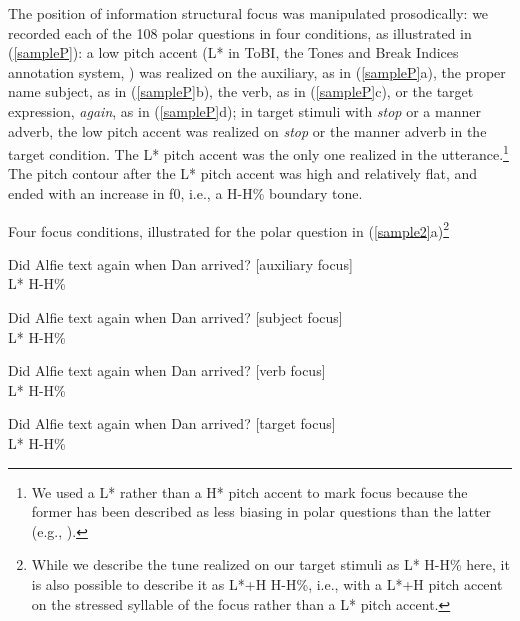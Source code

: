 \documentclass[a4paper,12pt]{article}
\newcommand{\6}{\mbox{$[\hspace*{-.6mm}[$}}
\newcommand{\9}{\mbox{$]\hspace*{-.6mm}]$}}
\begin{document}
The position of information structural focus was manipulated prosodically: we recorded each of the 108 polar questions in four conditions, as illustrated in (\ref{sampleP}): a low pitch accent (L* in ToBI, the Tones and Break Indices annotation system, \citealt{beckman-ayers97}) was realized on the auxiliary, as in (\ref{sampleP}a), the proper name subject, as in (\ref{sampleP}b),  the verb, as in (\ref{sampleP}c), or the target expression, {\em again}, as in (\ref{sampleP}d); in target stimuli with {\em stop} or a manner adverb, the low pitch accent was realized on {\em stop} or the manner adverb in the target condition. The L* pitch accent was the only one realized in the utterance.\footnote{We used a L* rather than a H* pitch accent to mark focus because the former has been described as less biasing in polar questions than the latter (e.g., \citealt[290ff.]{pierrehumbert-hirschberg1990}).} The pitch contour after the L* pitch accent was high and relatively flat, and ended with an increase in f0, i.e., a H-H\% boundary tone.
 
\begin{exe}
\ex\label{sampleP} Four focus conditions, illustrated for the polar question in (\ref{sample2}a)\footnote{While we describe the tune realized on our target stimuli as L* H-H\% here, it is also possible to describe it as L*+H H-H\%, i.e., with a L*+H pitch accent on the stressed syllable of the focus rather than a L* pitch accent.}
\begin{xlist}

\ex Did Alfie text again when Dan arrived? \hspace*{1cm} [auxiliary focus] \\ 
\hspace*{.1cm} L* \hspace*{4.9cm} H-H\%

\ex Did Alfie text again when Dan arrived?  \hspace*{1cm} [subject focus]
\\ 
\hspace*{.9cm} L* \hspace*{4.1cm} H-H\%

\ex Did Alfie text again when Dan arrived? \hspace*{1cm}  [verb focus]
\\ 
\hspace*{1.7cm} L* \hspace*{3.3cm} H-H\%

\ex Did Alfie text again when Dan arrived? \hspace*{1cm} [target focus]
\\ 
\hspace*{2.5cm} L* \hspace*{2.5cm} H-H\%

\end{xlist}
\end{exe}
\end{document}
